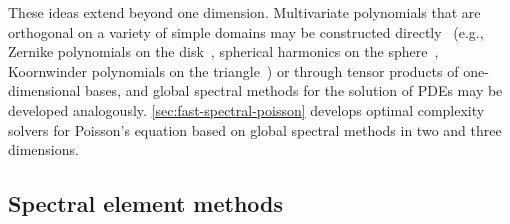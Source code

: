 


These ideas extend beyond one dimension. Multivariate polynomials that are orthogonal on a variety of simple domains may be constructed directly~\cite{Dunkl_14_01} (e.g., Zernike polynomials on the disk~\cite{Zernike_34_01}, spherical harmonics on the sphere~\cite{Atkinson_12_01}, Koornwinder polynomials on the triangle~\cite{Koornwinder_75_01}) or through tensor products of one-dimensional bases\cite{Trefethen_00_01,Boyd_01_01,Townsend_13_01,Townsend_16_01,Wilber_16_01,Wilber_17_01}, and global spectral methods for the solution of PDEs may be developed analogously. \cref{sec:fast-spectral-poisson} develops optimal complexity solvers for Poisson's equation based on global spectral methods in two and three dimensions. %

\subsection{Spectral element methods}

